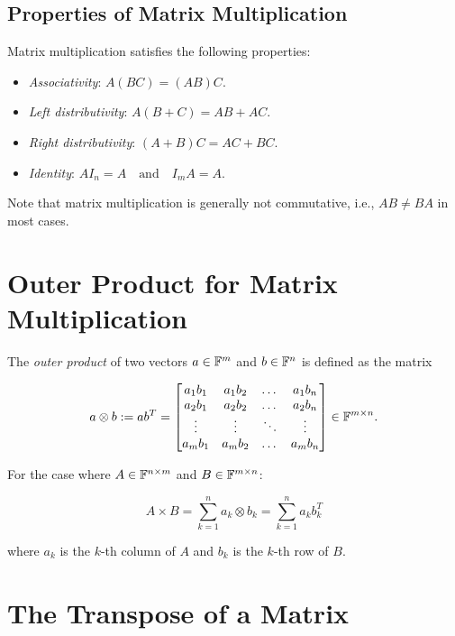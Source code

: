 \subsection{Properties of Matrix Multiplication}

Matrix multiplication satisfies the following properties:

\begin{itemize}

    \item \emph{Associativity}: \(A(BC) = (AB)C\).

    \item \emph{Left distributivity}: \(A(B+C) = AB + AC\).

    \item \emph{Right distributivity}: \((A+B)C = AC + BC\).

    \item \emph{Identity}: \(AI_n = A \quad \text{and} \quad I_m A = A\).

\end{itemize}

Note that matrix multiplication is generally not commutative, i.e., \(AB \neq BA\) in most cases.

\section{Outer Product for Matrix Multiplication}

The \emph{outer product} of two vectors \(a \in \mathbb{F}^m\) and \(b \in \mathbb{F}^n\) is defined as the matrix

\[
    a \otimes b := a b^T = 
    \begin{bmatrix}
        a_1 b_1 & a_1 b_2 & \dots & a_1 b_n \\
        a_2 b_1 & a_2 b_2 & \dots & a_2 b_n \\
        \vdots  & \vdots  & \ddots& \vdots  \\
        a_m b_1 & a_m b_2 & \dots & a_m b_n 
    \end{bmatrix} \in \mathbb{F}^{m \times n}.
\]

For the case where \(A \in \mathbb{F}^{n \times m}\) and \(B \in \mathbb{F}^{m \times n}\):

\[
    A \times B = \sum_{k = 1}^{n} a _{k} \otimes b_{k} = \sum_{k = 1}^{n} a_{k} b_{k}^{T}
\]

where \(a_k\) is the \(k\)-th column of \(A\) and \(b_k\) is the \(k\)-th row of \(B\).

\section{The Transpose of a Matrix}

